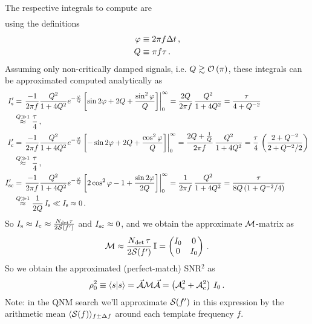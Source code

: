 \documentclass[aps,prd,onecolumn,notitlepage,nofootinbib,superscriptaddress,altaffilletter,floatfix]{revtex4-1}
\begin{document}
The respective integrals to compute are
\begin{align}
  \label{eq:18}
\end{align}
using the definitions
\begin{align}
  \label{eq:3}
  \varphi &\equiv 2\pi f \Delta t\,,\\
  Q       &\equiv \pi f \tau\,.
\end{align}
Assuming only non-critically damped signals, i.e. $Q\gtrsim \mathcal{O}\left(\pi\right)$, these integrals can be approximated computed analytically as
\begin{align}
  \label{eq:19}
  I_{\mathrm{s}}' &= \left. \frac{-1}{2\pi f}\frac{Q^2}{1 + 4Q^2}e^{-\frac{\varphi}{Q}}\left[ \sin2\varphi + 2Q + \frac{\sin^2\varphi}{Q}\right]\right|_0^\infty
  = \frac{2Q}{2\pi f}\,\frac{Q^2}{1+4Q^2}
  = \frac{\tau}{4 + Q^{-2}} \\
  & \stackrel{Q\gg1}{\approx} \frac{\tau}{4}\,,\\
  I_{\mathrm{c}}' &= \left. \frac{-1}{2\pi f}\frac{Q^2}{1 + 4Q^2}e^{-\frac{\varphi}{Q}}\left[ -\sin2\varphi + 2Q + \frac{\cos^2\varphi}{Q}\right]\right|_0^\infty
  = \frac{2Q + \frac{1}{Q}}{2\pi f}\,\frac{Q^2}{1+4Q^2} = \frac{\tau}{4}\,\left(\frac{2 + Q^{-2}}{2 + Q^{-2}/2}\right) \\
  & \stackrel{Q\gg1}{\approx} \frac{\tau}{4}\,,\\
  I_{\mathrm{sc}}' &= \left. \frac{-1}{2\pi f}\frac{Q^2}{1 + 4Q^2}e^{-\frac{\varphi}{Q}}\left[ 2\cos^2\varphi - 1 + \frac{\sin2\varphi}{2Q}\right]\right|_0^\infty
  = \frac{1}{2\pi f}\,\frac{Q^2}{1+4Q^2} = \frac{\tau}{8Q\,(1 + Q^{-2}/4)}\\
  &\stackrel{Q\gg1}{\approx} \frac{1}{2Q}\,I_{\mathrm{s}} \ll I_{\mathrm{s}} \approx 0\,.
\end{align}
So $I_{\mathrm{s}} \approx I_{\mathrm{c}} \approx \frac{N_{\mathrm{det}}\tau}{2\mathcal{S}(f')}$ and $I_{\mathrm{sc}}\approx 0$, and we obtain the approximate $\mathcal{M}$-matrix as
\begin{equation}
  \label{eq:42}
  \mathcal{M} \approx \frac{N_{\mathrm{det}}\,\tau}{2\mathcal{S}(f')}\,\mathbb{I} = \begin{pmatrix} I_0 & 0 \\ 0 & I_0 \end{pmatrix}\,.
\end{equation}
So we obtain the approximated (perfect-match) SNR$^2$ as
\begin{equation}
  \label{eq:20}
  \rho_0^2 \equiv \langle s|s\rangle = \vec{\mathcal{A}}\mathcal{M}\vec{\mathcal{A}} = \left(\mathcal{A}_{\mathrm{s}}^2 + \mathcal{A}_{\mathrm{c}}^2\right)\,I_0\,.
\end{equation}
Note: in the QNM search we'll approximate $\mathcal{S}(f')$ in this expression by the arithmetic mean $\langle\mathcal{S}(f)\rangle_{f\pm\Delta f}$ around each
template frequency $f$.


\end{document}
